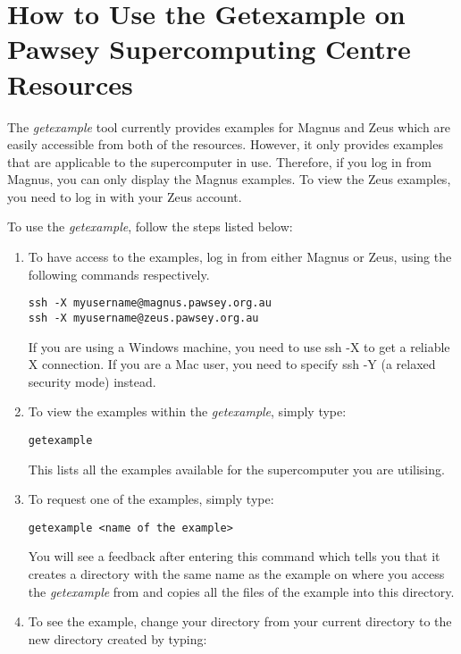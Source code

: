 \section{How to Use the Getexample on Pawsey Supercomputing Centre Resources}

The \emph{getexample} tool currently provides examples for Magnus and Zeus which are easily accessible from both of the resources. However, it only 
provides examples that are applicable to the supercomputer in use. Therefore, if you log in from Magnus, you can only display the Magnus examples. To 
view the Zeus examples, you need to log in with your Zeus account.

To use the \emph{getexample}, follow the steps listed below:

\begin{enumerate}
\item To have access to the examples, log in from either Magnus or Zeus, using the following commands respectively.
\begin{tcolorbox}
\begin{Verbatim}[fontsize=\small]
ssh -X myusername@magnus.pawsey.org.au
ssh -X myusername@zeus.pawsey.org.au
\end{Verbatim}
\end{tcolorbox}
If you are using a Windows machine, you need to use ssh -X to get a reliable X connection. If you are a Mac user, you need to specify ssh -Y (a relaxed
security mode) instead.
\item To view the examples within the \emph{getexample}, simply type:
\begin{tcolorbox}
\begin{Verbatim}[fontsize=\small]
getexample
\end{Verbatim}
\end{tcolorbox} 
This lists all the examples available for the supercomputer you are utilising.
\item To request one of the examples, simply type: 
\begin{tcolorbox}
\begin{Verbatim}[fontsize=\small]
getexample <name of the example>
\end{Verbatim}
\end{tcolorbox} 
You will see a feedback after entering this command which tells you that it creates a directory with the same name as the example on where you access the 
\emph{getexample} from and copies all the files of the example into this directory.
\item To see the example, change your directory from your current directory to the new directory created by typing: 

\end{enumerate}
